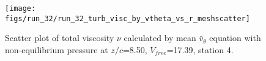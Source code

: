 \begin{figure}[H]
\centering
\texttt{[image: figs/run\_32/run\_32\_turb\_visc\_by\_vtheta\_vs\_r\_meshscatter]}
\caption{Scatter plot of total viscosity $\nu$ calculated by mean $\bar{v}_{\theta}$ equation with non-equilibrium pressure at $z/c$=8.50, $V_{free}$=17.39, station 4.}
\label{fig:run_32_turb_visc_by_vtheta_vs_r_meshscatter}
\end{figure}


